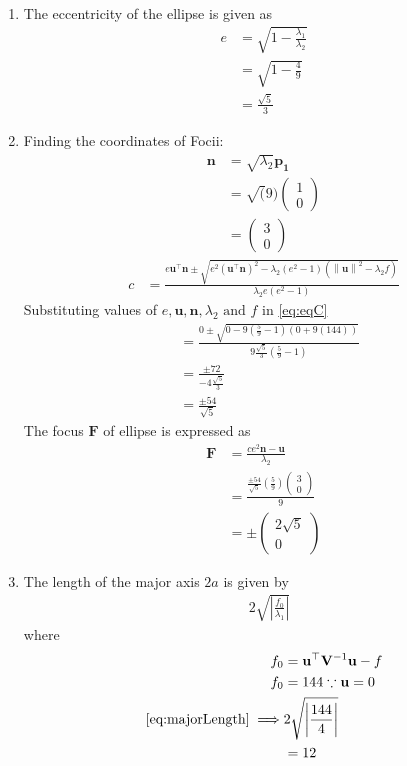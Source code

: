 \documentclass[12pt]{article}
\providecommand{\brak}[1]{\ensuremath{\left(#1\right)}}
\providecommand{\norm}[1]{\left\lVert#1\right\rVert}
\providecommand{\abs}[1]{\left\vert#1\right\vert}
\newcommand{\myvec}[1]{\ensuremath{\begin{pmatrix}#1\end{pmatrix}}}
\let\vec\mathbf
\begin{document}
\begin{enumerate}
\begin{align}
\end{align}
\begin{enumerate}
\item The eccentricity of the ellipse is given as  
\begin{align}
	e &= \sqrt{1-\frac{\lambda_1}{\lambda_2}} \\
	  &= \sqrt{1-\frac{4}{9}} \\
          &= \frac{\sqrt{5}}{3}
\end{align}
\item Finding the coordinates of Focii: 
\begin{align}
	\vec{n} &= \sqrt{\lambda_2}\vec{p_1} \\
	&= \sqrt(9)\myvec{1 \\ 0} \\
	\label{eq:eqN}
	&= \myvec{3 \\ 0} 
\end{align}
\begin{align}
	\label{eq:eqC}
	c  &=    \frac{e\vec{u}^{\top}\vec{n} \pm \sqrt{e^2\brak{\vec{u}^{\top}\vec{n}}^2-\lambda_2\brak{e^2-1}\brak{\norm{\vec{u}}^2 - \lambda_2 f}}}{\lambda_2e\brak{e^2-1}} 
\end{align}
Substituting values of $e, \vec{u}, \vec{n}, \lambda_2 \text{ and } f$ in \eqref{eq:eqC}
\begin{align}
	&=    \frac{0 \pm \sqrt{0-9\brak{\frac{5}{9}-1}\brak{{0 + 9\brak{144}}}}}{9\frac{\sqrt{5}}{3}\brak{\frac{5}{9}-1}} \\ 
	&=    \frac{ \pm 72}{-4\frac{\sqrt{5}}{3}}  \\ 
	&=    \frac{ \pm 54}{\sqrt{5}} 
\end{align}
The focus $\vec{F}$ of ellipse is expressed as
\begin{align}
	\vec{F} &= \frac{ce^2\vec{n}-\vec{u}}{\lambda_2} \\
	&= \frac{\frac{ \pm 54}{\sqrt{5}} \brak{\frac{5}{9}}\myvec{3 \\0}}{9} \\
	&= \pm \myvec{2\sqrt{5} \\ 0}
\end{align}
\item  The length of the major axis $2a$ is given by
\begin{align}
	\label{eq:majorLength}
	& 2\sqrt{\abs{\frac{f_0}{\lambda_1}}}
\end{align}
where
\begin{align}
	 f_0 &= \vec{u}^\top\vec{V}^{-1}\vec{u}-f \\
	 f_0 &= 144 \because \vec{u} = 0 \\
	\eqref{eq:majorLength} \implies  & 2\sqrt{\abs{\frac{144}{4}}}\\
	&= 12
\end{align}


\end{enumerate}
\end{enumerate}
\end{document}
